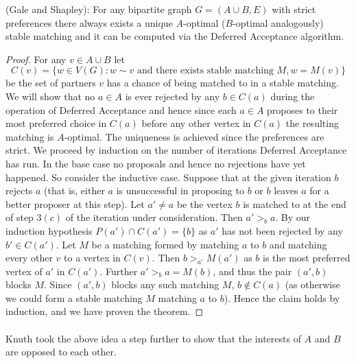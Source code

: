 \begin{theorem} (Gale and Shapley): For any bipartite graph $G = (A\cup B, E)$ with strict preferences there always exists a unique $A$-optimal ($B$-optimal analogously) stable matching and it can be computed via the Deferred Acceptance algorithm.
\end{theorem}
\begin{proof}
For any $v \in A\cup B$ let $$C(v) = \{w \in V(G) : w \sim v \text{ and there exists stable matching } M, w = M(v) \}$$ be the set of partners $v$ has a chance of being matched to in a stable matching. We will show that no $a \in A$ is ever rejected by any $b \in C(a)$ during the operation of Deferred Acceptance and hence since each $a \in A$ proposes to their most preferred choice in $C(a)$ before any other vertex in $C(a)$ the resulting matching is $A$-optimal. The uniqueness is achieved since the preferences are strict. We proceed by induction on the number of iterations Deferred Acceptance has run. In the base case no proposals and hence no rejections have yet happened. So consider the inductive case. Suppose that at the given iteration $b$ rejects $a$ (that is, either $a$ is unsuccessful in proposing to $b$ or $b$ leaves $a$ for a better proposer at this step). Let $a' \neq a$ be the vertex $b$ is matched to at the end of step $3(c)$ of the iteration under consideration. Then $a' >_b a$. By our induction hypothesis $P(a') \cap C(a') = \{b\}$ as $a'$ has not been rejected by any $b' \in C(a')$. Let $M$ be a matching formed by matching $a$ to $b$ and matching every other $v$ to a vertex in $C(v)$. Then $b >_{a'} M(a')$ as $b$ is the most preferred vertex of $a'$ in $C(a')$. Further $a' >_b a=M(b)$, and thus the pair $(a',b)$ blocks $M$. Since $(a',b)$ blocks any such matching $M$, $b \not\in C(a)$ (as otherwise we could form a stable matching $M$ matching $a$ to $b$). Hence the claim holds by induction, and we have proven the theorem. \end{proof}

\paragraph{} Knuth took the above idea a step further to show that the interests of $A$ and $B$ are opposed to each other. 

